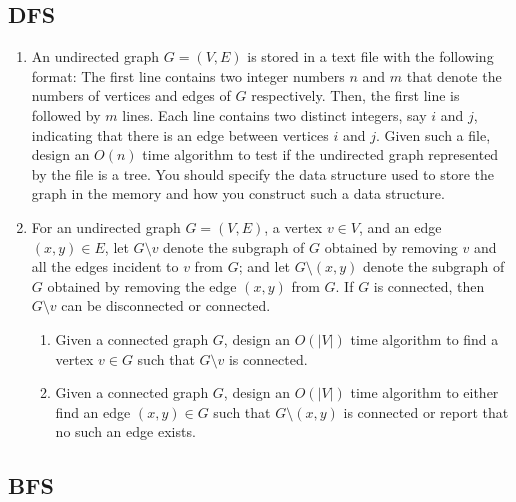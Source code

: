 \subsection{DFS}
\begin{Exercise}
\begin{enumerate}
\item An undirected graph $G = (V, E)$ is stored in a text file with the following format: The first line contains two integer numbers $n$ and $m$ that denote the numbers of vertices and edges of $G$ respectively. Then, the first line is followed by $m$ lines. Each line contains two distinct integers, say $i$ and $j$, indicating that there is an edge between vertices $i$ and $j$. Given such a file, design an $O(n)$ time algorithm to test if the undirected graph represented by the file is a tree. You should specify the data structure used to store the graph in the memory and how you construct such a data structure.  
\item For an undirected graph $G = (V, E)$, a vertex $v \in V$, and an edge $(x, y) \in E$, let $G\setminus v$ denote the subgraph of $G$ obtained by removing $v$ and all the edges incident to $v$ from $G$; and let $G\setminus(x, y)$ denote the subgraph of $G$ obtained by removing the edge $(x, y)$ from $G$. If $G$ is connected, then $G\setminus v$ can be disconnected or connected.
\begin{enumerate}
\item Given a connected graph $G$, design an $O(|V|)$ time algorithm to find a vertex $v \in G$ such that $G\setminus v$ is connected.
\item Given a connected graph $G$, design an $O(|V|)$ time algorithm to either find an edge $(x, y) \in G$ such that $G\setminus (x, y)$  is connected or report that no such an edge exists. 
\end{enumerate}
\end{enumerate}
\end{Exercise}
\begin{Answer}
\end{Answer}

\subsection{BFS}

